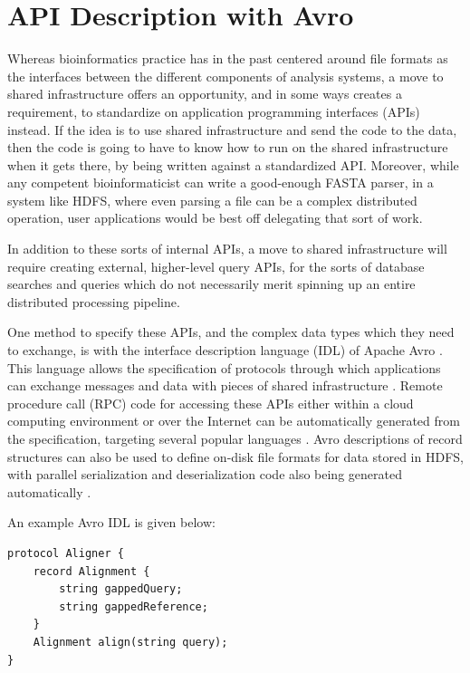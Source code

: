 \documentclass[11pt,proposal]{ucthesis}
\begin{document}
    

\section{API Description with Avro}

Whereas bioinformatics practice has in the past centered around file formats as the interfaces between the different components of analysis systems, a move to shared infrastructure offers an opportunity, and in some ways creates a requirement, to standardize on application programming interfaces (APIs) instead. If the idea is to use shared infrastructure and send the code to the data, then the code is going to have to know how to run on the shared infrastructure when it gets there, by being written against a standardized API. Moreover, while any competent bioinformaticist can write a good-enough FASTA parser, in a system like HDFS, where even parsing a file can be a complex distributed operation, user applications would be best off delegating that sort of work.

In addition to these sorts of internal APIs, a move to shared infrastructure will require creating external, higher-level query APIs, for the sorts of database searches and queries which do not necessarily merit spinning up an entire distributed processing pipeline.

One method to specify these APIs, and the complex data types which they need to exchange, is with the interface description language (IDL) of Apache Avro \cite{apache2014avro}. This language allows the specification of protocols through which applications can exchange messages and data with pieces of shared infrastructure \cite{apache2014avro}. Remote procedure call (RPC) code for accessing these APIs either within a cloud computing environment or over the Internet can be automatically generated from the specification, targeting several popular languages \cite{apache2014avro}. Avro descriptions of record structures can also be used to define on-disk file formats for data stored in HDFS, with parallel serialization and deserialization code also being generated automatically \cite{massie2013powerful}. 

An example Avro IDL is given below:

\begin{lstlisting}
protocol Aligner {
    record Alignment {
        string gappedQuery;
        string gappedReference;
    }
    Alignment align(string query);
}
\end{lstlisting}
\end{document}
